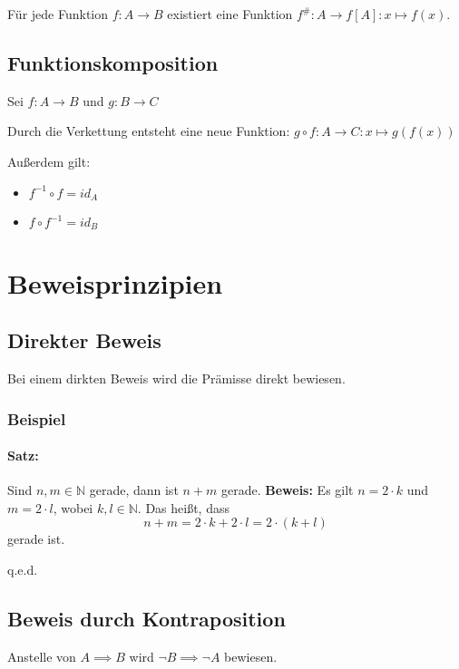 \documentclass[12pt]{scrreprt}
\newcommand{\theorem}[1]{\paragraph{Satz:} #1\newline}
\newenvironment{proof}
    {\textbf{Beweis:}\newline\indent}
    {\begin{flushright}q.e.d.\end{flushright}}
\begin{document}
                Für jede Funktion $ f : A \rightarrow B $ existiert eine Funktion $ f ^ \# : A \rightarrow f[A] : x \mapsto f(x) $.


            \subsection{Funktionskomposition}
                Sei $ f : A \rightarrow B $ und $ g : B \rightarrow C $

                Durch die Verkettung entsteht eine neue Funktion: $ g \circ f : A \rightarrow C : x \mapsto g(f(x)) $

                Außerdem gilt:
                \begin{itemize}
                    \item $ f ^ { -1 } \circ f = id _ A $
                    \item $ f \circ f ^ { -1 } = id _ B $
                \end{itemize}


        \section{Beweisprinzipien}
            \subsection{Direkter Beweis}
                Bei einem dirkten Beweis wird die Prämisse direkt bewiesen.

                \subsubsection{Beispiel}
                    \theorem{Sind $ n, m \in \mathbb{N} $ gerade, dann ist $ n + m $ gerade.}
                        \begin{proof}
                            Es gilt $ n = 2 \cdot k $ und $ m = 2 \cdot l $, wobei $ k, l \in \mathbb{N} $. Das heißt, dass \[ n + m = 2 \cdot k + 2 \cdot l = 2 \cdot (k + l) \] gerade ist.
                        \end{proof}


            \subsection{Beweis durch Kontraposition}
                Anstelle von $ A \implies B $ wird $ \lnot B \implies \lnot A $ bewiesen.
\end{document}
